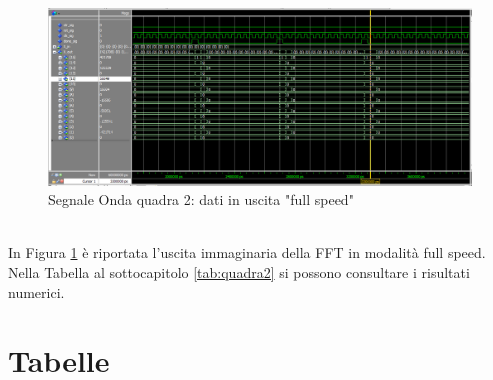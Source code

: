 \documentclass[a4paper, titlepage]{article}
\begin{document}
\begin{figure}[h]
    \centering
    \includegraphics[scale=0.45]{test_square2/fs_q(+5-5)_out_doble2.png}
    \caption{Segnale Onda quadra 2:  dati in uscita "full speed"}
    \label{fig:square2_out_doble2}
\end{figure}
\\In Figura \ref{fig:square2_out_doble2} è riportata l'uscita immaginaria della FFT in modalità full speed.
Nella Tabella al sottocapitolo \ref{tab:quadra2} si possono consultare i risultati numerici.
\newpage
\section{Tabelle}
\end{document}
